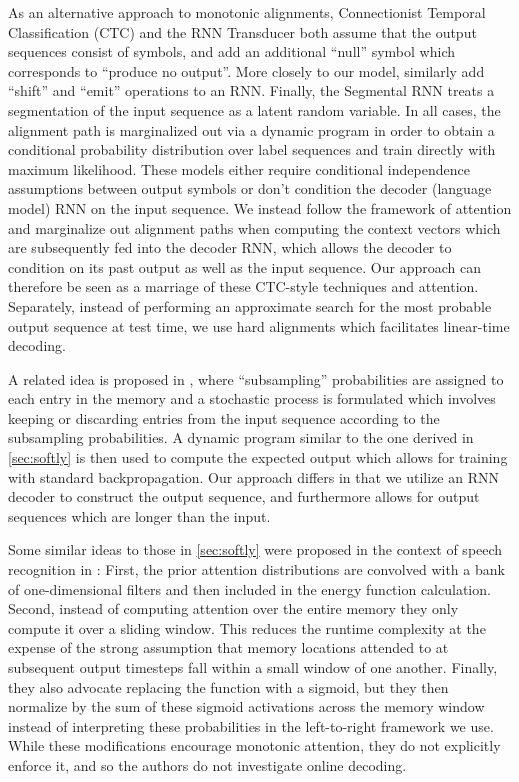 \documentclass{article}
\begin{document}
As an alternative approach to monotonic alignments, Connectionist Temporal Classification (CTC)  and the RNN Transducer  both assume that the output sequences consist of symbols, and add an additional ``null'' symbol which corresponds to ``produce no output''.
More closely to our model,  similarly add ``shift'' and ``emit'' operations to an RNN.
Finally, the Segmental RNN  treats a segmentation of the input sequence as a latent random variable.
In all cases, the alignment path is marginalized out via a dynamic program in order to obtain a conditional probability distribution over label sequences and train directly with maximum likelihood.
These models either require conditional independence assumptions between output symbols or don't condition the decoder (language model) RNN on the input sequence.
We instead follow the framework of attention and marginalize out alignment paths when computing the context vectors  which are subsequently fed into the decoder RNN, which allows the decoder to condition on its past output as well as the input sequence.
Our approach can therefore be seen as a marriage of these CTC-style techniques and attention.
Separately, instead of performing an approximate search for the most probable output sequence at test time, we use hard alignments which facilitates linear-time decoding.

A related idea is proposed in , where ``subsampling'' probabilities are assigned to each entry in the memory and a stochastic process is formulated which involves keeping or discarding entries from the input sequence according to the subsampling probabilities.
A dynamic program similar to the one derived in \cref{sec:softly} is then used to compute the expected output which allows for training with standard backpropagation.
Our approach differs in that we utilize an RNN decoder to construct the output sequence, and furthermore allows for output sequences which are longer than the input.

Some similar ideas to those in \cref{sec:softly} were proposed in the context of speech recognition in :
First, the prior attention distributions are convolved with a bank of one-dimensional filters and then included in the energy function calculation.
Second, instead of computing attention over the entire memory they only compute it over a sliding window.
This reduces the runtime complexity at the expense of the strong assumption that memory locations attended to at subsequent output timesteps fall within a small window of one another.
Finally, they also advocate replacing the  function with a sigmoid, but they then normalize by the sum of these sigmoid activations across the memory window instead of interpreting these probabilities in the left-to-right framework we use.
While these modifications encourage monotonic attention, they do not explicitly enforce it, and so the authors do not investigate online decoding.
\end{document}
